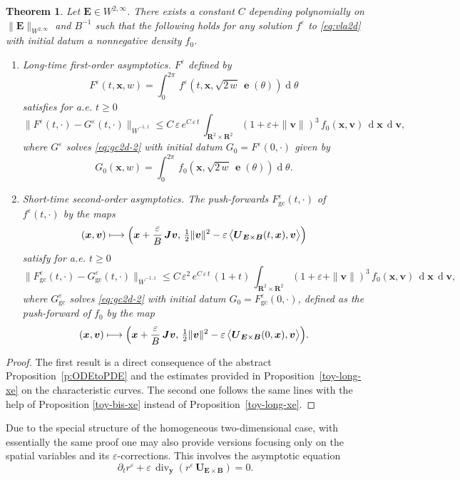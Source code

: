 \documentclass[10pt]{amsart}
\newenvironment{enumeratei}
{\bgroup\def\theenumi{\roman{enumi}}\def\theenumii{\arabic{enumii}}\begin{enumerate}}
{\end{enumerate}\egroup}
\newcommand\mto{\mathchoice{\longmapsto}{\mapsto}{\mapsto}{\mapsto}}
\newcommand{\blangle}{\bigl\langle}
\newcommand{\brangle}{\bigr\rangle}
\let\eps\varepsilon
\let\d\partial
\DeclareMathOperator\dD{d}\let\dd\dD
\DeclareMathOperator{\Div}{div}
\theoremstyle{plain}
\newtheorem{theorem}{Theorem}[section]
\theoremstyle{definition}
\newcommand{\be}{\begin{equation}}
\newcommand{\ee}{\end{equation}}
\newcommand{\bt}{\begin{theorem}}
\newcommand{\et}{\end{theorem}}
\newcommand\R{\mathbf R}
\newcommand\bB{{\boldsymbol B}}
\newcommand\bE{{\boldsymbol E}}
\newcommand\bJ{{\boldsymbol J}}
\newcommand\bU{{\boldsymbol U}}
\newcommand\bfv{{\boldsymbol v}}
\newcommand\bfx{{\boldsymbol x}}
\newcommand\bfy{{\boldsymbol y}}
\DeclareMathOperator{\beD}{\boldsymbol{e}}
\let\e w
\newcommand{\EcB}{\bU_{\bE\times\bB}}
\begin{document}
\bt
\label{toy-density}
Let $\bE\in W^{2,\infty}$. There exists a constant $C$ depending polynomially on $\|\bE\|_{W^{2,\infty}}$ and $B^{-1}$ such that the following holds for any solution $f^\eps$ to \eqref{eq:vla2d} with initial datum a nonnegative density $f_0$.
\begin{enumeratei}
\item
\emph{Long-time first-order asymptotics}. $F^\eps$ defined by
\[
F^\eps(t,\bfx,\e)=\int_0^{2\pi}\,f^\eps(t,\bfx,\sqrt{2\,\e}\,\beD(\theta))\dD \theta
\]
satisfies for a.e. $t\geq0$
\[
\|F^\eps(t,\cdot)-G^\eps(t,\cdot)\|_{\dot{W}^{-1,1}}\leq C\,\eps\,e^{C\,\eps\,t}\,\int_{\R^2\times\R^2}(1+\eps+\|\bfv\|)^3\,f_0(\bfx,\bfv)\,\dD\bfx\,\dD\bfv,
\]
where $G^\eps$ solves \eqref{eq:gc2d-2} with initial datum $G_0=F^\eps(0,\cdot)$ given by
\[
G_0(\bfx,\e)=\int_0^{2\pi}\,f_0(\bfx,\sqrt{2\,\e}\,\beD(\theta))\dD \theta.
\]

\item
\emph{Short-time second-order asymptotics}. The push-forwards $F_\mathrm{gc}^\eps(t,\cdot)$ of $f^\eps(t,\cdot)$ by the maps
\[
(\bfx,\bfv)\mto \Bigl(\bfx+\frac{\eps}{B}\,\bJ\bfv,\,
\tfrac12\|\bfv\|^2-\eps\,\blangle\EcB(t,\bfx),\bfv\brangle\Bigr)
\]
satisfy for a.e. $t\geq0$
\[
\|F_\mathrm{gc}^\eps(t,\cdot)-G_\mathrm{gc}^\eps(t,\cdot)\|_{\dot{W}^{-1,1}}\leq C\,\eps^2\,e^{C\,\eps\,t}\,(1+t)\,\int_{\R^2\times\R^2}(1+\eps+\|\bfv\|)^3\,f_0(\bfx,\bfv)\,\dD\bfx\,\dD\bfv,
\]
where $G_\mathrm{gc}^\eps$ solves \eqref{eq:gc2d-2} with initial datum $G_0=F_\mathrm{gc}^\eps(0,\cdot)$, defined as the push-forward of $f_0$ by the map
\[
(\bfx,\bfv)\mto \Bigl(\bfx+\frac{\eps}{B}\,\bJ\bfv,\,
\tfrac12\|\bfv\|^2-\eps\,\blangle\EcB(0,\bfx),\bfv\brangle\Bigr).
\]
\end{enumeratei}
\et
\begin{proof}
The first result is a direct consequence of the abstract Proposition~\ref{p:ODEtoPDE} and the estimates provided in Proposition~\ref{toy-long-xe} on the characteristic curves. The second one follows the same lines with the help of Proposition \ref{toy-bis-xe} instead of Proposition~\ref{toy-long-xe}.
\end{proof}

Due to the special structure of the homogeneous two-dimensional case, with essentially the same proof one may also provide versions focusing only on the spatial variables and its $\eps$-corrections. This involves the asymptotic equation
\be\label{eq:gc2d-2x}
\d_t r^\eps+\eps\,\Div_\bfy\left(r^\eps\,\EcB\right)
=0.
\ee
\end{document}

